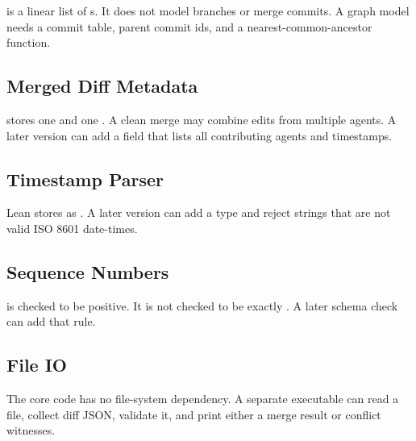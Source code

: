  is a linear list of s. It does not model
branches or merge commits. A graph model needs a commit table, parent commit
ids, and a nearest-common-ancestor function.

\subsection{Merged Diff Metadata}

 stores one  and one . A clean merge may
combine edits from multiple agents. A later version can add a field that lists
all contributing agents and timestamps.

\subsection{Timestamp Parser}

Lean stores  as . A later version can add a
 type and reject strings that are not valid ISO 8601
date-times.

\subsection{Sequence Numbers}

 is checked to be positive. It is not checked to be exactly
. A later schema check can add that rule.

\subsection{File IO}

The core code has no file-system dependency. A separate executable can read a
file, collect diff JSON, validate it, and print either a merge result or
conflict witnesses.
